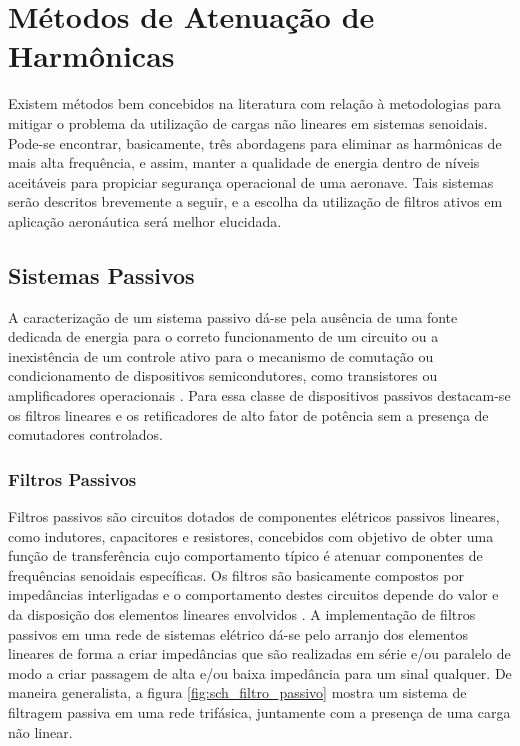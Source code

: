 \section{Métodos de Atenuação de Harmônicas}

Existem métodos bem concebidos na literatura com relação à metodologias para mitigar o problema da utilização de cargas não lineares em sistemas senoidais. Pode-se encontrar, basicamente, três abordagens para eliminar as harmônicas de mais alta frequência, e assim, manter a qualidade de energia dentro de níveis aceitáveis para propiciar segurança operacional de uma aeronave. Tais sistemas serão descritos brevemente a seguir, e a escolha da utilização de filtros ativos em aplicação aeronáutica será melhor elucidada.  

\subsection{Sistemas Passivos}

A caracterização de um sistema passivo dá-se pela ausência de uma fonte dedicada de energia para o correto funcionamento de um circuito ou a inexistência de um controle ativo para o mecanismo de comutação ou condicionamento de dispositivos semicondutores, como transistores ou amplificadores operacionais \cite{AN779}. Para essa classe de dispositivos passivos destacam-se os filtros lineares e os retificadores de alto fator de potência sem a presença de comutadores controlados. 

\subsubsection{Filtros Passivos} 

Filtros passivos são circuitos dotados de componentes elétricos passivos lineares, como indutores, capacitores e resistores, concebidos com objetivo de obter uma função de transferência cujo comportamento típico é atenuar componentes de frequências senoidais específicas. Os filtros são basicamente compostos por impedâncias interligadas e o comportamento destes circuitos depende do valor e da disposição dos elementos lineares envolvidos \cite{Mussoi2004,Kassick2010}. A implementação de filtros passivos em uma rede de sistemas elétrico dá-se pelo arranjo dos elementos lineares de forma a criar impedâncias que são realizadas em série e/ou paralelo de modo a criar passagem de alta e/ou baixa impedância para um sinal qualquer. De maneira generalista, a figura \ref{fig:sch_filtro_passivo} mostra um sistema de filtragem passiva em uma rede trifásica, juntamente com a presença de uma carga não linear.

